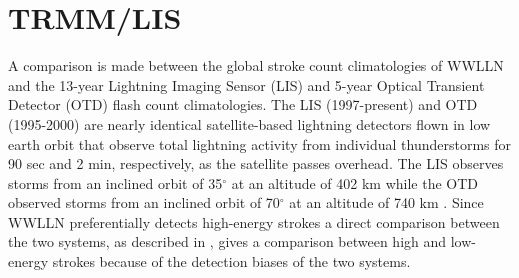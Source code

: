 \section{TRMM/LIS}

A comparison is made between the global stroke count climatologies of WWLLN and the 13-year Lightning Imaging Sensor (LIS) and 5-year Optical Transient Detector (OTD) flash count climatologies. 
The LIS (1997-present) and OTD (1995-2000) are nearly identical satellite-based lightning detectors flown in low earth orbit that observe total lightning activity from individual thunderstorms for 90 sec and 2 min, respectively, as the satellite passes overhead.
The LIS observes storms from an inclined orbit of 35$^\circ$ at an altitude of 402 km while the OTD observed storms from an inclined orbit of 70$^\circ$ at an altitude of 740 km \citep{Christian1999, Christian2003}.
Since WWLLN preferentially detects high-energy strokes \citep{Hutchins2012a} a direct comparison between the two systems, as described in \citet{Virts2013}, gives a comparison between high and low-energy strokes because of the detection biases of the two systems.
